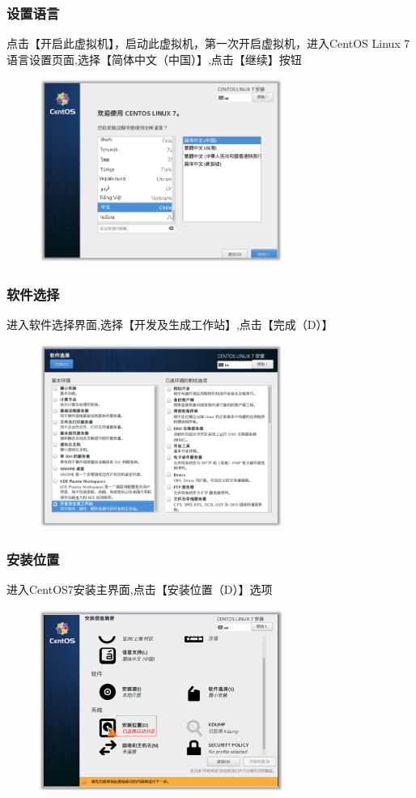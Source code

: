 \documentclass[notheorems,serif]{beamer}
\begin{document}
\begin{frame}
\frametitle{设置语言}
点击【开启此虚拟机】，启动此虚拟机，第一次开启虚拟机，进入CentOS Linux 7语言设置页面,选择【简体中文（中国）】,点击【继续】按钮
\begin{figure}
 \centering
 \includegraphics[width=8cm,height=6cm]{./figures/图片25.png}
\end{figure}
\end{frame}

\begin{frame}
\frametitle{软件选择}
进入软件选择界面,选择【开发及生成工作站】,点击【完成（D）】
\begin{figure}
 \centering
 \includegraphics[width=8cm,height=6cm]{./figures/图片26.png}
\end{figure}
\end{frame}

\begin{frame}
\frametitle{安装位置}
进入CentOS7安装主界面,点击【安装位置（D）】选项
\begin{figure}
 \centering
 \includegraphics[width=8cm,height=6cm]{./figures/图片27.png}
\end{figure}
\end{frame}
\end{document}
